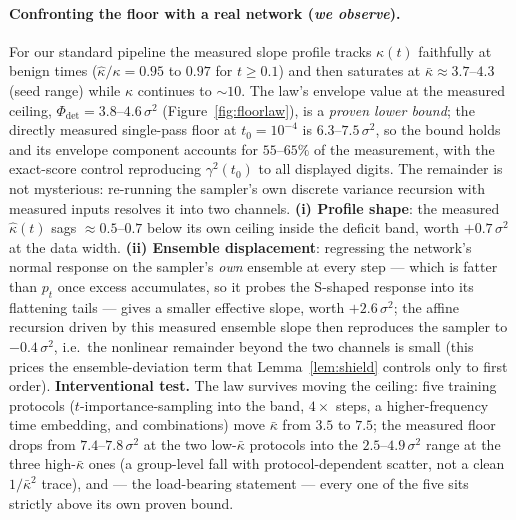 \documentclass[11pt]{article}
\theoremstyle{remark}
\newcommand{\kb}{\bar\kappa}
\newcommand{\Phidet}{\Phi_{\mathrm{det}}}
\newcommand{\sigsq}{\sigma^2}
\begin{document}
\paragraph{Confronting the floor with a real network (\emph{we observe}).} For our
standard pipeline the measured slope profile tracks $\kappa(t)$ faithfully at benign
times ($\hat\kappa/\kappa=0.95$ to $0.97$ for $t\ge0.1$) and then saturates at
$\kb\approx3.7$--$4.3$ (seed range) while $\kappa$ continues to $\sim\!10$. The law's
envelope value at the measured ceiling, $\Phidet=3.8$--$4.6\,\sigsq$
(Figure~\ref{fig:floorlaw}), is a \emph{proven lower bound}; the directly measured
single-pass floor at $t_0=10^{-4}$ is $6.3$--$7.5\,\sigsq$, so the bound holds and its
envelope component accounts for $55$--$65\%$ of the measurement, with the exact-score
control reproducing $\gamma^2(t_0)$ to all displayed digits. The remainder is not
mysterious: re-running the sampler's own discrete variance recursion with measured
inputs resolves it into two channels. \textbf{(i) Profile shape}: the measured
$\hat\kappa(t)$ sags $\approx0.5$--$0.7$ below its own ceiling inside the deficit band,
worth $+0.7\,\sigsq$ at the data width. \textbf{(ii) Ensemble displacement}: regressing
the network's normal response on the sampler's \emph{own} ensemble at every step ---
which is fatter than $p_t$ once excess accumulates, so it probes the S-shaped response
into its flattening tails --- gives a smaller effective slope, worth $+2.6\,\sigsq$;
the affine recursion driven by this measured ensemble slope then reproduces the sampler
to $-0.4\,\sigsq$, i.e.\ the nonlinear remainder beyond the two channels is small (this
prices the ensemble-deviation term that Lemma~\ref{lem:shield} controls only to first
order). \textbf{Interventional test.} The law survives moving the ceiling: five
training protocols ($t$-importance-sampling into the band, $4\times$ steps, a
higher-frequency time embedding, and combinations) move $\kb$ from $3.5$ to $7.5$; the
measured floor drops from $7.4$--$7.8\,\sigsq$ at the two low-$\kb$ protocols into the
$2.5$--$4.9\,\sigsq$ range at the three high-$\kb$ ones (a group-level fall with
protocol-dependent scatter, not a clean $1/\kb^2$ trace), and --- the load-bearing
statement --- every one of the five sits strictly above its own proven bound.
\end{document}
